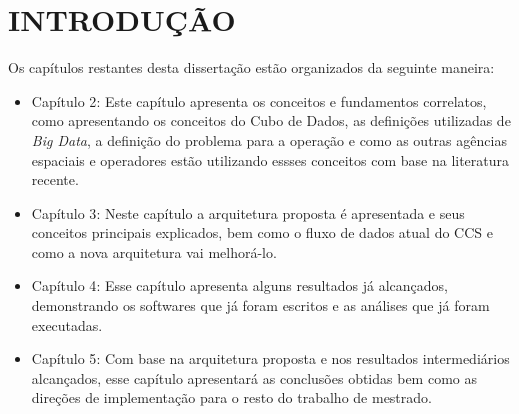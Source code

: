 
\chapter{INTRODUÇÃO}

Os capítulos restantes desta dissertação estão organizados da seguinte maneira:
\begin{itemize}
\item{Capítulo 2}: Este capítulo apresenta os conceitos e fundamentos correlatos, como apresentando os conceitos do Cubo de Dados, as definições utilizadas de \textit{Big Data}, a definição do problema para a operação e como as outras agências espaciais e operadores estão utilizando essses conceitos com base na literatura recente.
\item{Capítulo 3}: Neste capítulo a arquitetura proposta é apresentada e seus conceitos principais explicados, bem como o fluxo de dados atual do CCS e como a nova arquitetura vai melhorá-lo.
\item{Capítulo 4}: Esse capítulo apresenta alguns resultados já alcançados, demonstrando os softwares que já foram escritos e as análises que já foram executadas.
\item{Capítulo 5}: Com base na arquitetura proposta e nos resultados intermediários alcançados, esse capítulo apresentará as conclusões obtidas bem como as direções de implementação para o resto do trabalho de mestrado.
\end{itemize}

